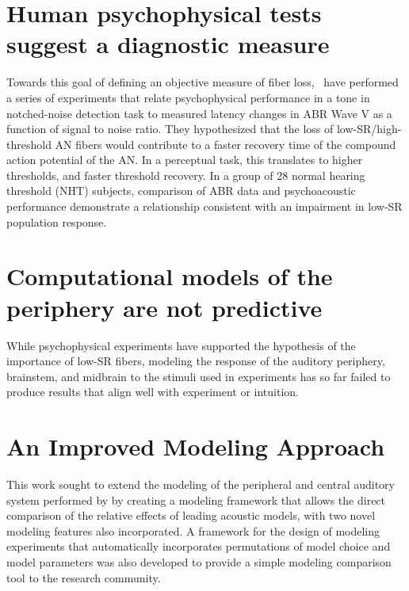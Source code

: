 \section{Human psychophysical tests suggest a diagnostic measure}
Towards this goal of defining an objective measure of fiber loss,~\cite{Mehraei2015Individual,Mehraei2016Auditory} have performed a series of experiments that relate psychophysical performance in a tone in notched-noise detection task to measured latency changes in ABR Wave V as a function of signal to noise ratio.  They hypothesized that the loss of low-SR/high-threshold AN fibers would contribute to a faster recovery time of the compound action potential of the AN.  In a perceptual task, this translates to higher thresholds, and faster threshold recovery. In a group of 28 normal hearing threshold (NHT) subjects, comparison of ABR data and psychoacoustic performance demonstrate a relationship consistent with an impairment in low-SR population response.

\section{Computational models of the periphery are not predictive}

While psychophysical experiments have supported the hypothesis of the importance of low-SR fibers, modeling the response of the auditory periphery, brainstem, and midbrain to the stimuli used in experiments has so far failed to produce results that align well with experiment or intuition.

\section{An Improved Modeling Approach} %
\label{sec:an_improved_modeling_approach}
This work sought to extend the modeling of the peripheral and central auditory system performed by \citeauthor{Mehraei2015Auditory} by creating a modeling framework that allows the direct comparison of the relative effects of leading acoustic models, with two novel modeling features also incorporated.  A framework for the design of modeling experiments that automatically incorporates permutations of model choice and model parameters was also developed to provide a simple modeling comparison tool to the research community. 


